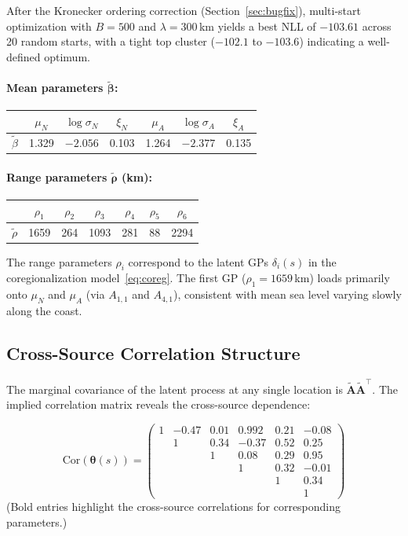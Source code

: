 \documentclass[11pt]{article}
\newcommand{\btheta}{\bm{\theta}}
\newcommand{\bbeta}{\bm{\beta}}
\newcommand{\bA}{\mathbf{A}}
\begin{document}
After the Kronecker ordering correction (Section~\ref{sec:bugfix}), multi-start optimization with $B = 500$ and $\lambda = 300$\,km yields a best NLL of $-103.61$ across 20 random starts, with a tight top cluster ($-102.1$ to $-103.6$) indicating a well-defined optimum.

\paragraph{Mean parameters $\tilde{\bbeta}$:}
\begin{center}
\begin{tabular}{@{}lcccccc@{}}
\toprule
& $\mu_N$ & $\log\sigma_N$ & $\xi_N$ & $\mu_A$ & $\log\sigma_A$ & $\xi_A$ \\
\midrule
$\tilde{\beta}$ & 1.329 & $-2.056$ & 0.103 & 1.264 & $-2.377$ & 0.135 \\
\bottomrule
\end{tabular}
\end{center}

\paragraph{Range parameters $\tilde{\bm{\rho}}$ (km):}
\begin{center}
\begin{tabular}{@{}lcccccc@{}}
\toprule
& $\rho_1$ & $\rho_2$ & $\rho_3$ & $\rho_4$ & $\rho_5$ & $\rho_6$ \\
\midrule
$\tilde{\rho}$ & 1659 & 264 & 1093 & 281 & 88 & 2294 \\
\bottomrule
\end{tabular}
\end{center}
The range parameters $\rho_i$ correspond to the latent GPs $\delta_i(s)$ in the coregionalization model~\eqref{eq:coreg}. The first GP ($\rho_1 = 1659$\,km) loads primarily onto $\mu_N$ and $\mu_A$ (via $A_{1,1}$ and $A_{4,1}$), consistent with mean sea level varying slowly along the coast.

\subsection{Cross-Source Correlation Structure}
\label{sec:correlation}

The marginal covariance of the latent process at any single location is $\tilde{\bA}\tilde{\bA}^\top$. The implied correlation matrix reveals the cross-source dependence:

\begin{equation}\label{eq:corr_matrix}
\text{Cor}(\btheta(s)) = 
\begin{pmatrix}
1 & -0.47 & 0.01 & \mathbf{0.992} & 0.21 & -0.08 \\
 & 1 & 0.34 & -0.37 & \mathbf{0.52} & 0.25 \\
 & & 1 & 0.08 & 0.29 & \mathbf{0.95} \\
 & & & 1 & 0.32 & -0.01 \\
 & & & & 1 & 0.34 \\
 & & & & & 1
\end{pmatrix}
\end{equation}
(Bold entries highlight the cross-source correlations for corresponding parameters.)
\end{document}
